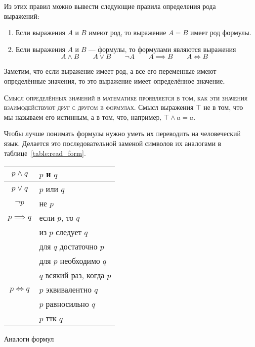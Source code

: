 Из этих правил можно вывести следующие правила определения рода выражений:
\begin{enumerate}
	\item{}Если выражения $A$ и $B$ имеют род,
	то выражение $A=B$ имеет род формулы.

	\item{}Если выражения $A$ и $B$ --- формулы, то формулами являются выражения
	\[
		A\land B\qquad A\lor B\qquad \lnot A\qquad A\implies B\qquad A\iff B
	\]
\end{enumerate}

Заметим, что если выражение имеет род, а все его переменные
имеют определённые значения, то это выражение имеет определённое значение.

\textsc{Смысл определённых значений в математике проявляется в том,
	как эти значения взаимодействуют
	друг с другом в формулах.}
Смысл выражения $\top$ не в том, что мы называем его истинным,
а в том, что, например, $\top\land a=a$.


Чтобы лучше понимать формулы нужно уметь их переводить на человеческий язык. Делается
это последовательной заменой символов их аналогами в таблице~\ref{table:read_form}.
\begin{margintable}
	\begin{tabular}{cl}
		$p\land q$    & $p$ и $q$                 \\\hline
		$p\lor q$     & $p$ или $q$               \\\hline
		$\lnot p$     & не $p$                    \\\hline
		$p\implies q$ & если $p$, то $q$          \\
		              & из $p$ следует $q$        \\
		              & для $q$ достаточно $p$    \\
		              & для $p$ необходимо $q$    \\
		              & $q$ всякий раз, когда $p$ \\\hline
		$p\iff q$     & $p$ эквивалентно $q$      \\
		              & $p$ равносильно $q$       \\
		              & $p$ ттк $q$
	\end{tabular}
	\caption{Аналоги формул}\label{table:read_form}
\end{margintable}

